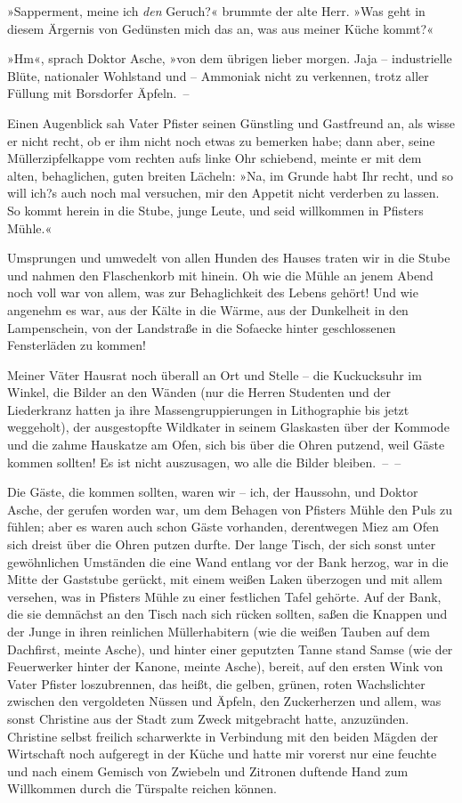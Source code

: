 »Sapperment, meine ich \emph{den} Geruch?« brummte der alte Herr.
»Was geht in diesem Ärgernis von Gedünsten mich das an, was aus
meiner Küche kommt?«

»Hm«, sprach Doktor Asche, »von dem übrigen lieber morgen. Jaja –
industrielle Blüte, nationaler Wohlstand und – Ammoniak nicht zu
verkennen, trotz aller Füllung mit Borsdorfer Äpfeln.~–

Einen Augenblick sah Vater Pfister seinen Günstling und Gastfreund
an, als wisse er nicht recht, ob er ihm nicht noch etwas zu
bemerken habe; dann aber, seine Müllerzipfelkappe vom rechten aufs
linke Ohr schiebend, meinte er mit dem alten, behaglichen, guten
breiten Lächeln: »Na, im Grunde habt Ihr recht, und so will ich?s
auch noch mal versuchen, mir den Appetit nicht verderben zu lassen.
So kommt herein in die Stube, junge Leute, und seid willkommen in
Pfisters Mühle.«

Umsprungen und umwedelt von allen Hunden des Hauses traten wir in
die Stube und nahmen den Flaschenkorb mit hinein. Oh wie die Mühle
an jenem Abend noch voll war von allem, was zur Behaglichkeit des
Lebens gehört! Und wie angenehm es war, aus der Kälte in die Wärme,
aus der Dunkelheit in den Lampenschein, von der Landstraße in die
Sofaecke hinter geschlossenen Fensterläden zu kommen!

Meiner Väter Hausrat noch überall an Ort und Stelle – die
Kuckucksuhr im Winkel, die Bilder an den Wänden (nur die Herren
Studenten und der Liederkranz hatten ja ihre Massengruppierungen in
Lithographie bis jetzt weggeholt), der ausgestopfte Wildkater in
seinem Glaskasten über der Kommode und die zahme Hauskatze am Ofen,
sich bis über die Ohren putzend, weil Gäste kommen sollten! Es ist
nicht auszusagen, wo alle die Bilder bleiben.~–~–

Die Gäste, die kommen sollten, waren wir – ich, der Haussohn, und
Doktor Asche, der gerufen worden war, um dem Behagen von Pfisters
Mühle den Puls zu fühlen; aber es waren auch schon Gäste vorhanden,
derentwegen Miez am Ofen sich dreist über die Ohren putzen durfte.
Der lange Tisch, der sich sonst unter gewöhnlichen Umständen die
eine Wand entlang vor der Bank herzog, war in die Mitte der
Gaststube gerückt, mit einem weißen Laken überzogen und mit allem
versehen, was in Pfisters Mühle zu einer festlichen Tafel gehörte.
Auf der Bank, die sie demnächst an den Tisch nach sich rücken
sollten, saßen die Knappen und der Junge in ihren reinlichen
Müllerhabitern (wie die weißen Tauben auf dem Dachfirst, meinte
Asche), und hinter einer geputzten Tanne stand Samse (wie der
Feuerwerker hinter der Kanone, meinte Asche), bereit, auf den
ersten Wink von Vater Pfister loszubrennen, das heißt, die gelben,
grünen, roten Wachslichter zwischen den vergoldeten Nüssen und
Äpfeln, den Zuckerherzen und allem, was sonst Christine aus der
Stadt zum Zweck mitgebracht hatte, anzuzünden. Christine selbst
freilich scharwerkte in Verbindung mit den beiden Mägden der
Wirtschaft noch aufgeregt in der Küche und hatte mir vorerst nur
eine feuchte und nach einem Gemisch von Zwiebeln und Zitronen
duftende Hand zum Willkommen durch die Türspalte reichen können.

